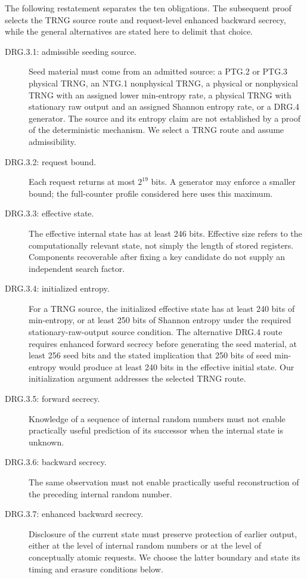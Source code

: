 \documentclass[journal=tosc,preprint,floatrow,nohyperxmp]{iacrtrans}
\numberwithin{lemma}{section}
\numberwithin{proposition}{section}
\numberwithin{equation}{section}
\theoremstyle{definition}
\numberwithin{definition}{section}
\theoremstyle{plain}
\begin{document}
The following restatement separates the ten obligations. The subsequent proof selects the TRNG source route and request-level enhanced backward secrecy, while the general alternatives are stated here to delimit that choice.
\begin{description}
\item[DRG.3.1: admissible seeding source.]
Seed material must come from an admitted source: a PTG.2 or PTG.3 physical TRNG, an NTG.1 nonphysical TRNG, a physical or nonphysical TRNG with an assigned lower min-entropy rate, a physical TRNG with stationary raw output and an assigned Shannon entropy rate, or a DRG.4 generator. The source and its entropy claim are not established by a proof of the deterministic mechanism. We select a TRNG route and assume admissibility.
\item[DRG.3.2: request bound.]
Each request returns at most $2^{19}$ bits. A generator may enforce a smaller bound; the full-counter profile considered here uses this maximum.
\item[DRG.3.3: effective state.]
The effective internal state has at least 246 bits. Effective size refers to the computationally relevant state, not simply the length of stored registers. Components recoverable after fixing a key candidate do not supply an independent search factor.
\item[DRG.3.4: initialized entropy.]
For a TRNG source, the initialized effective state has at least 240 bits of min-entropy, or at least 250 bits of Shannon entropy under the required stationary-raw-output source condition. The alternative DRG.4 route requires enhanced forward secrecy before generating the seed material, at least 256 seed bits and the stated implication that 250 bits of seed min-entropy would produce at least 240 bits in the effective initial state. Our initialization argument addresses the selected TRNG route.
\item[DRG.3.5: forward secrecy.]
Knowledge of a sequence of internal random numbers must not enable practically useful prediction of its successor when the internal state is unknown.
\item[DRG.3.6: backward secrecy.]
The same observation must not enable practically useful reconstruction of the preceding internal random number.
\item[DRG.3.7: enhanced backward secrecy.]
Disclosure of the current state must preserve protection of earlier output, either at the level of internal random numbers or at the level of conceptually atomic requests. We choose the latter boundary and state its timing and erasure conditions below.

\end{description}
\end{document}
